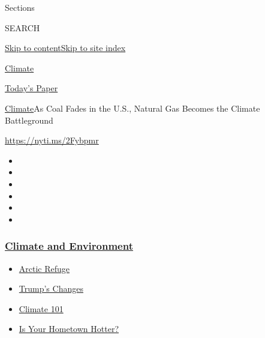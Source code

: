 Sections

SEARCH

\protect\hyperlink{site-content}{Skip to
content}\protect\hyperlink{site-index}{Skip to site index}

\href{https://www.nytimes3xbfgragh.onion/section/climate}{Climate}

\href{https://myaccount.nytimes3xbfgragh.onion/auth/login?response_type=cookie\&client_id=vi}{}

\href{https://www.nytimes3xbfgragh.onion/section/todayspaper}{Today's
Paper}

\href{/section/climate}{Climate}\textbar{}As Coal Fades in the U.S.,
Natural Gas Becomes the Climate Battleground

\url{https://nyti.ms/2Fybpmr}

\begin{itemize}
\item
\item
\item
\item
\item
\item
\end{itemize}

\hypertarget{climate-and-environment}{%
\subsubsection{\texorpdfstring{\href{https://www.nytimes3xbfgragh.onion/section/climate?name=styln-climate\&region=TOP_BANNER\&variant=undefined\&block=storyline_menu_recirc\&action=click\&pgtype=Article\&impression_id=e07e3bf0-e38b-11ea-befc-036b724b9a9b}{Climate
and
Environment}}{Climate and Environment}}\label{climate-and-environment}}

\begin{itemize}
\tightlist
\item
  \href{https://www.nytimes3xbfgragh.onion/2020/08/17/climate/alaska-oil-drilling-anwr.html?name=styln-climate\&region=TOP_BANNER\&variant=undefined\&block=storyline_menu_recirc\&action=click\&pgtype=Article\&impression_id=e07e3bf1-e38b-11ea-befc-036b724b9a9b}{Arctic
  Refuge}
\item
  \href{https://www.nytimes3xbfgragh.onion/interactive/2020/climate/trump-environment-rollbacks.html?name=styln-climate\&region=TOP_BANNER\&variant=undefined\&block=storyline_menu_recirc\&action=click\&pgtype=Article\&impression_id=e07e3bf2-e38b-11ea-befc-036b724b9a9b}{Trump's
  Changes}
\item
  \href{https://www.nytimes3xbfgragh.onion/interactive/2020/04/19/climate/climate-crash-course-1.html?name=styln-climate\&region=TOP_BANNER\&variant=undefined\&block=storyline_menu_recirc\&action=click\&pgtype=Article\&impression_id=e07e3bf3-e38b-11ea-befc-036b724b9a9b}{Climate
  101}
\item
  \href{https://www.nytimes3xbfgragh.onion/interactive/2018/08/30/climate/how-much-hotter-is-your-hometown.html?name=styln-climate\&region=TOP_BANNER\&variant=undefined\&block=storyline_menu_recirc\&action=click\&pgtype=Article\&impression_id=e07e3bf4-e38b-11ea-befc-036b724b9a9b}{Is
  Your Hometown Hotter?}
\end{itemize}

